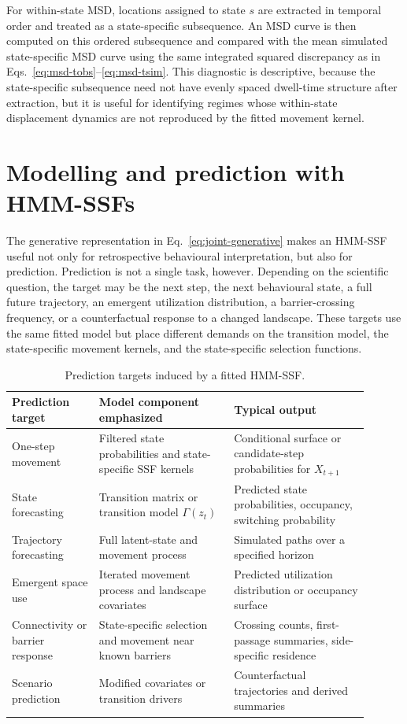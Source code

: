 \documentclass[11pt]{article}
\begin{document}
For within-state MSD, locations assigned to state $s$ are extracted in temporal
order and treated as a state-specific subsequence. An MSD curve is then
computed on this ordered subsequence and compared with the mean simulated
state-specific MSD curve using the same integrated squared discrepancy as in
Eqs.~\eqref{eq:msd-tobs}--\eqref{eq:msd-tsim}. This diagnostic is descriptive,
because the state-specific subsequence need not have evenly spaced dwell-time
structure after extraction, but it is useful for identifying regimes whose
within-state displacement dynamics are not reproduced by the fitted movement
kernel.

\section{Modelling and prediction with HMM-SSFs}

The generative representation in Eq.~\eqref{eq:joint-generative} makes an
HMM-SSF useful not only for retrospective behavioural interpretation, but also
for prediction. Prediction is not a single task, however. Depending on the
scientific question, the target may be the next step, the next behavioural
state, a full future trajectory, an emergent utilization distribution, a
barrier-crossing frequency, or a counterfactual response to a changed
landscape. These targets use the same fitted model but place different demands
on the transition model, the state-specific movement kernels, and the
state-specific selection functions.

\begin{table}[ht]
\centering
\caption{Prediction targets induced by a fitted HMM-SSF.}
\label{tab:prediction-targets}
\begin{tabular}{p{0.22\linewidth}p{0.34\linewidth}p{0.34\linewidth}}
\toprule
Prediction target & Model component emphasized & Typical output \\
\midrule
One-step movement & Filtered state probabilities and state-specific SSF kernels & Conditional surface or candidate-step probabilities for $X_{t+1}$ \\
State forecasting & Transition matrix or transition model $\Gamma(z_t)$ & Predicted state probabilities, occupancy, switching probability \\
Trajectory forecasting & Full latent-state and movement process & Simulated paths over a specified horizon \\
Emergent space use & Iterated movement process and landscape covariates & Predicted utilization distribution or occupancy surface \\
Connectivity or barrier response & State-specific selection and movement near known barriers & Crossing counts, first-passage summaries, side-specific residence \\
Scenario prediction & Modified covariates or transition drivers & Counterfactual trajectories and derived summaries \\
\bottomrule
\end{tabular}
\end{table}
\end{document}
